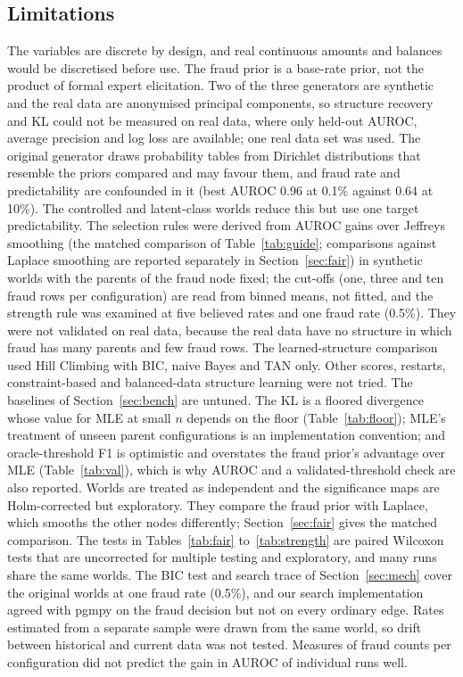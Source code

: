 \documentclass[final,5p,times,authoryear]{elsarticle}
\begin{document}
\subsection{Limitations}\label{sec:limits}
The variables are discrete by design, and real continuous amounts and balances would be discretised before use. The fraud prior is a base-rate prior, not the product of formal expert elicitation. Two of the three generators are synthetic and the real data are anonymised principal components, so structure recovery and KL could not be measured on real data, where only held-out AUROC, average precision and log loss are available; one real data set was used. The original generator draws probability tables from Dirichlet distributions that resemble the priors compared and may favour them, and fraud rate and predictability are confounded in it (best AUROC 0.96 at 0.1\% against 0.64 at 10\%). The controlled and latent-class worlds reduce this but use one target predictability. The selection rules were derived from AUROC gains over Jeffreys smoothing (the matched comparison of Table~\ref{tab:guide}; comparisons against Laplace smoothing are reported separately in Section~\ref{sec:fair}) in synthetic worlds with the parents of the fraud node fixed; the cut-offs (one, three and ten fraud rows per configuration) are read from binned means, not fitted, and the strength rule was examined at five believed rates and one fraud rate (0.5\%). They were not validated on real data, because the real data have no structure in which fraud has many parents and few fraud rows. The learned-structure comparison used Hill Climbing with BIC, naive Bayes and TAN only. Other scores, restarts, constraint-based and balanced-data structure learning were not tried. The baselines of Section~\ref{sec:bench} are untuned. The KL is a floored divergence whose value for MLE at small $n$ depends on the floor (Table~\ref{tab:floor}); MLE's treatment of unseen parent configurations is an implementation convention; and oracle-threshold F1 is optimistic and overstates the fraud prior's advantage over MLE (Table~\ref{tab:val}), which is why AUROC and a validated-threshold check are also reported. Worlds are treated as independent and the significance maps are Holm-corrected but exploratory. They compare the fraud prior with Laplace, which smooths the other nodes differently; Section~\ref{sec:fair} gives the matched comparison. The tests in Tables~\ref{tab:fair} to~\ref{tab:strength} are paired Wilcoxon tests that are uncorrected for multiple testing and exploratory, and many runs share the same worlds. The BIC test and search trace of Section~\ref{sec:mech} cover the original worlds at one fraud rate (0.5\%), and our search implementation agreed with pgmpy on the fraud decision but not on every ordinary edge. Rates estimated from a separate sample were drawn from the same world, so drift between historical and current data was not tested. Measures of fraud counts per configuration did not predict the gain in AUROC of individual runs well.
\end{document}
